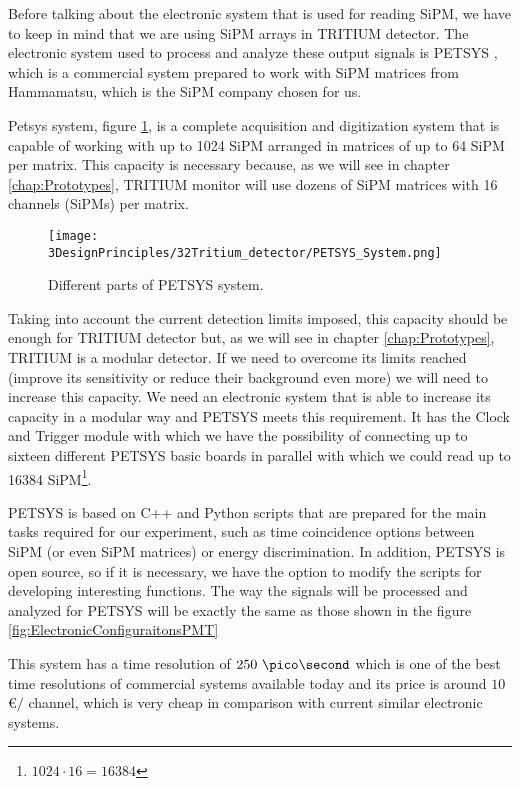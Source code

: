 Before talking about the electronic system that is used for reading SiPM, we have to keep in mind that we are using SiPM arrays in TRITIUM detector. The electronic system used to process and analyze these output signals is PETSYS \cite{PETSYS}, which is a commercial system prepared to work with SiPM matrices from Hammamatsu, which is the SiPM company chosen for us.

Petsys system, figure \ref{fig:PETSYS}, is a complete acquisition and digitization system that is capable of working with up to 1024 SiPM arranged in matrices of up to 64 SiPM per matrix. This capacity is necessary because, as we will see in chapter \ref{chap:Prototypes}, TRITIUM monitor will use dozens of SiPM matrices with 16 channels (SiPMs) per matrix.

\begin{figure}[htbp]
\centering
\texttt{[image: 3DesignPrinciples/32Tritium\_detector/PETSYS\_System.png]}
\caption{Different parts of PETSYS system.\label{fig:PETSYS}~\cite{PETSYS}}
\end{figure}

Taking into account the current detection limits imposed, this capacity should be enough for TRITIUM detector but, as we will see in chapter \ref{chap:Prototypes}, TRITIUM is a modular detector. If we need to overcome its limits reached (improve its sensitivity or reduce their background even more) we will need to increase this capacity. We need an electronic system that is able to increase its capacity in a modular way and PETSYS meets this requirement. It has the Clock and Trigger module with which we have the possibility of connecting up to sixteen different PETSYS basic boards in parallel with which we could read up to 16384 SiPM\footnote{$1024\cdot{}16 = 16384$}.

PETSYS is based on C++ and Python scripts that are prepared for the main tasks required for our experiment, such as time coincidence options between SiPM (or even SiPM matrices) or energy discrimination. In addition, PETSYS is open source, so if it is necessary, we have the option to modify the scripts for developing interesting functions. The way the signals will be processed and analyzed for PETSYS will be exactly the same as those shown in the figure \ref{fig:ElectronicConfiguraitonsPMT}

This system has a time resolution of $250~\pico\second$ which is one of the best time resolutions of commercial systems available today and its price is around $10$\euro$/$ channel, which is very cheap in comparison with current similar electronic systems.

